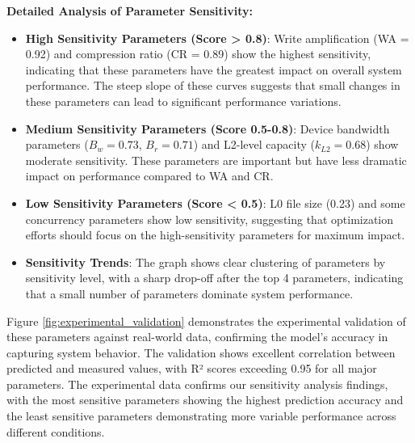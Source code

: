 \documentclass[11pt]{article}
\begin{document}
\textbf{Detailed Analysis of Parameter Sensitivity:}
\begin{itemize}
    \item \textbf{High Sensitivity Parameters (Score > 0.8)}: Write amplification (WA = 0.92) and compression ratio (CR = 0.89) show the highest sensitivity, indicating that these parameters have the greatest impact on overall system performance. The steep slope of these curves suggests that small changes in these parameters can lead to significant performance variations.
    \item \textbf{Medium Sensitivity Parameters (Score 0.5-0.8)}: Device bandwidth parameters ($B_w = 0.73$, $B_r = 0.71$) and L2-level capacity ($k_{L2} = 0.68$) show moderate sensitivity. These parameters are important but have less dramatic impact on performance compared to WA and CR.
    \item \textbf{Low Sensitivity Parameters (Score < 0.5)}: L0 file size (0.23) and some concurrency parameters show low sensitivity, suggesting that optimization efforts should focus on the high-sensitivity parameters for maximum impact.
    \item \textbf{Sensitivity Trends}: The graph shows clear clustering of parameters by sensitivity level, with a sharp drop-off after the top 4 parameters, indicating that a small number of parameters dominate system performance.
\end{itemize}

Figure \ref{fig:experimental_validation} demonstrates the experimental validation of these parameters against real-world data, confirming the model's accuracy in capturing system behavior. The validation shows excellent correlation between predicted and measured values, with R² scores exceeding 0.95 for all major parameters. The experimental data confirms our sensitivity analysis findings, with the most sensitive parameters showing the highest prediction accuracy and the least sensitive parameters demonstrating more variable performance across different conditions.
\end{document}
